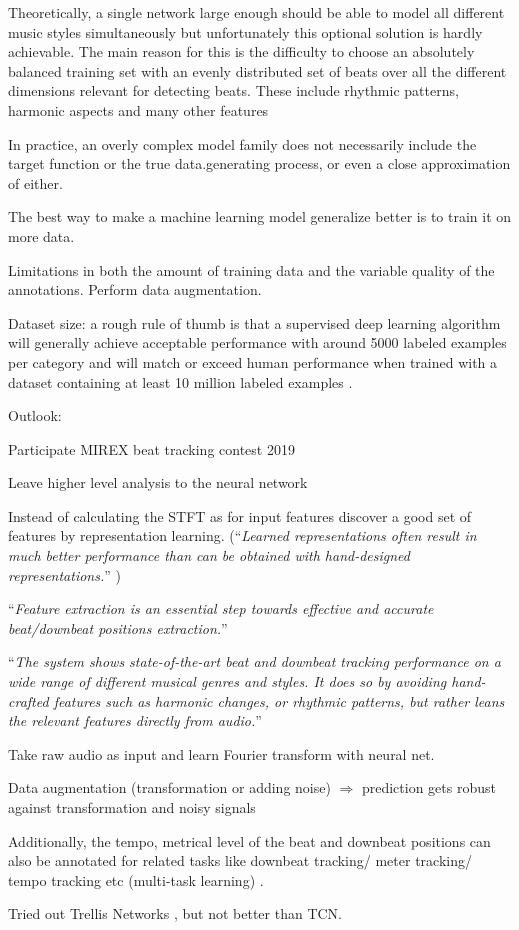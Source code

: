 \documentclass{scrartcl}
\begin{document}
Theoretically, a single network large enough should be able to model all different music styles simultaneously but unfortunately this optional solution is hardly achievable. The main reason for this is the difficulty to choose an absolutely balanced training set with an evenly distributed set of beats over all the different dimensions relevant for detecting beats. These include rhythmic patterns, harmonic aspects and many other features

In practice, an overly complex model family does not necessarily include the target function or the true data.generating process, or even a close approximation of either.




The best way to make a machine learning model generalize better is to train it on more data. 

Limitations in both the amount of training data and the variable quality of the annotations. Perform data augmentation. 

Dataset size: a rough rule of thumb is that a supervised deep learning algorithm will generally achieve acceptable performance with around 5000 labeled examples per category and will match or exceed human performance when trained with a dataset containing at least 10 million labeled examples \cite{Goodfellow2016}.



Outlook:

Participate MIREX beat tracking contest 2019

Leave higher level analysis to the neural network

Instead of calculating the STFT as for input features discover a good set of features by representation learning. (``\emph{Learned representations often result in much better performance than can be obtained with hand-designed representations.}'' \cite{Goodfellow2016})

``\emph{Feature extraction is an essential step towards effective and accurate beat/downbeat positions extraction.}'' \cite{Khadkevich2012}

``\emph{The system shows state-of-the-art beat and downbeat tracking performance on a wide range of different musical genres and styles. It does so by avoiding hand-crafted features such as harmonic changes, or rhythmic patterns, but rather leans the relevant features directly from audio.}'' \cite{Boeck2016b}

Take raw audio as input and learn Fourier transform with neural net.

Data augmentation (transformation or adding noise) $\Rightarrow$ prediction gets robust against transformation and noisy signals

Additionally, the tempo, metrical level of the beat and downbeat positions can also be annotated for related tasks like downbeat tracking/ meter tracking/ tempo tracking etc (multi-task learning) \cite{Boeck2019}.

Tried out Trellis Networks \cite{Bai2018b}, but not better than TCN. 



\newpage 


\end{document}
